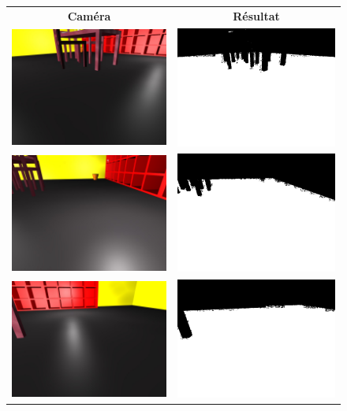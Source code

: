 \documentclass{article}
\begin{document}
\begin{figure}
    \begin{center}
        \begin{tabular}{cc}
            \textbf{Caméra} & \textbf{Résultat} \\
            \includegraphics[width=0.4\linewidth]{rcs/abodv0s.png} & \includegraphics[width=0.4\linewidth]{rcs/abodv0r.png} \\
            \includegraphics[width=0.4\linewidth]{rcs/abodv1s.png} & \includegraphics[width=0.4\linewidth]{rcs/abodv1r.png} \\
            \includegraphics[width=0.4\linewidth]{rcs/abodv2s.png} & \includegraphics[width=0.4\linewidth]{rcs/abodv2r.png} \\

\end{tabular}
\end{center}
\end{figure}
\end{document}
